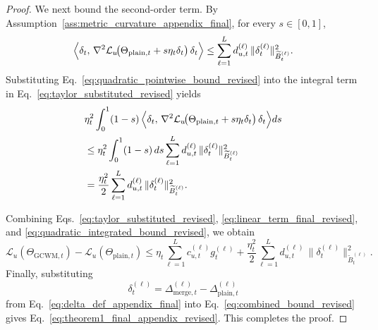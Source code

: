 \documentclass[10pt,a4paper]{amsart}
\begin{document}
\begin{proof}
We next bound the second-order term. By Assumption~\ref{ass:metric_curvature_appendix_final}, for every \(s\in[0,1]\),
\begin{equation}
\Bigl\langle
\delta_t,\,
\nabla^2\mathcal L_u\!\bigl(\Theta_{\mathrm{plain},t}+s\eta_t\delta_t\bigr)\,
\delta_t
\Bigr\rangle
\le
\sum_{\ell=1}^L
d_{u,t}^{(\ell)}
\,
\|\delta_t^{(\ell)}\|_{\widetilde B_t^{(\ell)}}^2.
\label{eq:quadratic_pointwise_bound_revised}
\end{equation}
Substituting Eq.~\eqref{eq:quadratic_pointwise_bound_revised} into the integral term in Eq.~\eqref{eq:taylor_substituted_revised} yields
\begin{align}
&\eta_t^2
\int_0^1 (1-s)\,
\Bigl\langle
\delta_t,\,
\nabla^2\mathcal L_u\!\bigl(\Theta_{\mathrm{plain},t}+s\eta_t\delta_t\bigr)\,
\delta_t
\Bigr\rangle ds
\nonumber\\
&\le
\eta_t^2
\int_0^1 (1-s)\,ds
\sum_{\ell=1}^L
d_{u,t}^{(\ell)}
\,
\|\delta_t^{(\ell)}\|_{\widetilde B_t^{(\ell)}}^2
\nonumber\\
&=
\frac{\eta_t^2}{2}
\sum_{\ell=1}^L
d_{u,t}^{(\ell)}
\,
\|\delta_t^{(\ell)}\|_{\widetilde B_t^{(\ell)}}^2.
\label{eq:quadratic_integrated_bound_revised}
\end{align}

Combining Eqs.~\eqref{eq:taylor_substituted_revised}, \eqref{eq:linear_term_final_revised}, and \eqref{eq:quadratic_integrated_bound_revised}, we obtain
\begin{equation}
\mathcal L_u(\Theta_{\mathrm{GCWM},t})
-
\mathcal L_u(\Theta_{\mathrm{plain},t})
\le
\eta_t \sum_{\ell=1}^L c_{u,t}^{(\ell)} g_t^{(\ell)}
+
\frac{\eta_t^2}{2}
\sum_{\ell=1}^L
d_{u,t}^{(\ell)}
\,
\|\delta_t^{(\ell)}\|_{\widetilde B_t^{(\ell)}}^2.
\label{eq:combined_bound_revised}
\end{equation}
Finally, substituting
\[
\delta_t^{(\ell)}
=
\Delta_{\mathrm{merge},t}^{(\ell)}-\Delta_{\mathrm{plain},t}^{(\ell)}
\]
from Eq.~\eqref{eq:delta_def_appendix_final} into Eq.~\eqref{eq:combined_bound_revised} gives Eq.~\eqref{eq:theorem1_final_appendix_revised}. This completes the proof.
\end{proof}
\end{document}
